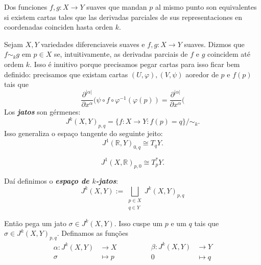 \begin{defn}\leavevmode

	Dos funciones \(f,g:X\to Y\) suaves que mandan \(p\) al mismo punto son equivalentes si existem cartas tales que las derivadas parciales de sus representaciones en coordenadas coinciden hasta orden \(k\).

Sejam \(X, Y\) variedades diferenciaveis suaves e \(f,g:X \to Y\) suaves. Dizmos que \(f \sim_k g\) em \(p \in X\) se, intuitivamente, as derivadas parciais de \(f \) e \(g\) coincidem até ordem $k$. Isso é inuitivo porque precisamos pegar cartas para isso ficar bem definido: precisamos que existam cartas \((U, \varphi),(V,\psi)\) aoredor de \(p\) e \(f(p)\) tais que
\[\frac{\partial ^{|\alpha|}}{\partial x^\alpha}(\psi \circ f \circ \varphi^{-1}(\varphi(p))=\frac{\partial ^{| \alpha|}}{\partial x^\alpha}(\]
Los \textit{\textbf{jatos}} son gérmenes:
\[J^k(X,Y)_{p,q}=\{f:X \to Y: f(p)=q\}\Big/ \sim_k.\]
Isso generaliza o espaço tangente do seguinte jeito:
\[J^1(\mathbb{R},Y)_{0,q} \cong T_qY.\]
\begin{exercise}\leavevmode
\[J^1(X,\mathbb{R})_{p,0}\cong T_p^*Y.\]
\end{exercise}
Daí definimos o \textit{\textbf{espaço de $k$-jatos}}:
\[J^k(X,Y):= \bigsqcup_{\substack{p \in X \\ q \in Y}}J^k(X,Y)_{p,q}\]

Então pega um jato \(\sigma \in J^k(X,Y)\). Isso cuspe um \(p\) e um  \(q\) tais que  \(\sigma \in J^k(X,Y)_{p,q}\). Definamos as funções
\[\begin{aligned}
	\alpha: J^k(X,Y) &\longrightarrow X \\
	\sigma &\longmapsto p
\end{aligned}\qquad \qquad \begin{aligned}
	\beta: J^k(X,Y) &\longrightarrow Y \\
	0 &\longmapsto q
\end{aligned}\]
\end{defn}

